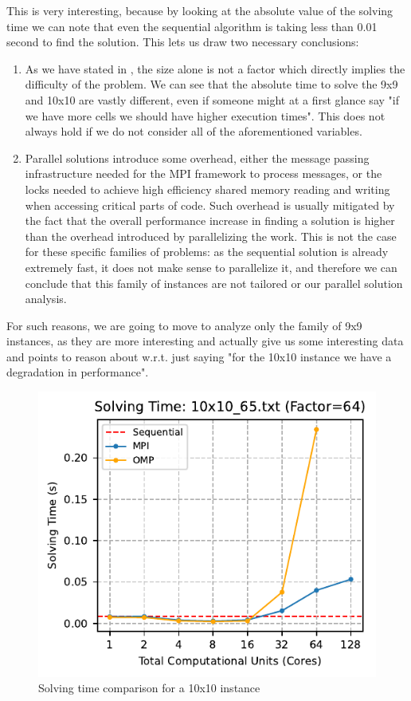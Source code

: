 This is very interesting, because by looking at the absolute value of the solving time we can note that even the sequential algorithm is taking less than 0.01 second to find the solution. This lets us draw two necessary conclusions:
\begin{enumerate}
    \item As we have stated in , the size alone is not a factor which directly implies the difficulty of the problem. We can see that the absolute time to solve the 9x9 and 10x10 are vastly different, even if someone might at a first glance say "if we have more cells we should have higher execution times". This does not always hold if we do not consider all of the aforementioned variables.
    \item Parallel solutions introduce some overhead, either the message passing infrastructure needed for the MPI framework to process messages, or the locks needed to achieve high efficiency shared memory reading and writing when accessing critical parts of code. Such overhead is usually mitigated by the fact that the overall performance increase in finding a solution is higher than the overhead introduced by parallelizing the work. This is not the case for these specific families of problems: as the sequential solution is already extremely fast, it does not make sense to parallelize it, and therefore we can conclude that this family of instances are not tailored or our parallel solution analysis.
\end{enumerate}

For such reasons, we are going to move to analyze only the family of 9x9 instances, as they are more interesting and actually give us some interesting data and points to reason about w.r.t. just saying "for the 10x10 instance we have a degradation in performance".

\begin{figure}[htbp]
\centering
\includegraphics[width=0.9\linewidth]{imgs/solving_time_mpi_omp_10x10_65.pdf}
\caption{Solving time comparison for a 10x10 instance}
\label{fig:comparison_solving_time_10x10}
\end{figure}

